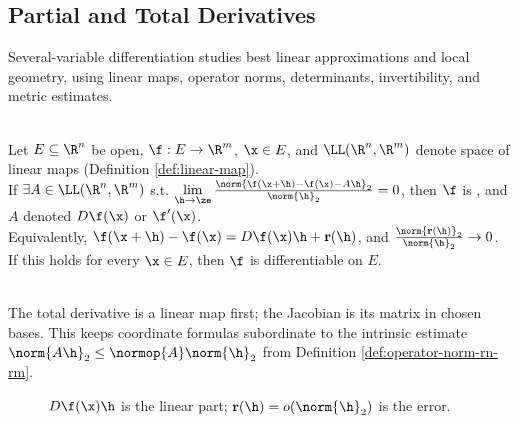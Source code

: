 \subsection{Partial and Total Derivatives}

%

Several-variable differentiation studies best linear approximations and local geometry, using linear maps, operator norms, determinants, invertibility, and metric estimates.

\begin{definition} \label{def:several-variable-differentiation-core-source-todo}\label{def:total-derivative-rn-rm} \\
Let $E\subseteq\R^n$ be open, $\f:E\to\R^m$, $\x\in E$, and $\LL(\R^n,\R^m)$ denote space of linear maps (Definition \ref{def:linear-map}).\\
If $\exists A\in\LL(\R^n,\R^m)$ s.t. $\lim\limits_{\h\to\ze}\frac{\norm{\f(\x+\h)-\f(\x)-A\h}_2}{\norm{\h}_2}=0$, then $\f$ is , and $A$ denoted $D\f(\x)$ or $\f'(\x)$.\\
Equivalently, $\f(\x+\h)-\f(\x)=D\f(\x)\h+\mathbf{r}(\h)$, and $\frac{\norm{\mathbf{r}(\h)}_2}{\norm{\h}_2}\to0$.\\
If this holds for every $\x\in E$, then $\f$ is differentiable on $E$.
\end{definition}

\begin{perspective} \label{per:total-derivative-linear-map-first} \\
The total derivative is a linear map first; the Jacobian is its matrix in chosen bases. This keeps coordinate formulas subordinate to the intrinsic estimate $\norm{A\h}_2\leq\normop{A}\norm{\h}_2$ from Definition \ref{def:operator-norm-rn-rm}.
\end{perspective}

\begin{figure}[H]
  \centering
  
  \caption{$D\f(\x)\h$ is the linear part; $\mathbf{r}(\h)=o(\norm{\h}_2)$ is the error.}
  \label{fig:total-derivative-linear-approximation}
\end{figure}

